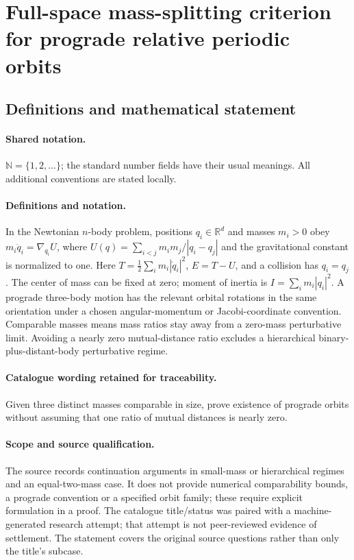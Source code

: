 \documentclass[11pt]{article}
\begin{document}
\section{Full-space mass-splitting criterion for prograde relative periodic orbits}\label{statement}

\subsection{Definitions and mathematical statement}

\paragraph{Shared notation.}$\mathbb N=\{1,2,\ldots\}$; the standard number fields have their usual meanings. All additional conventions are stated locally.


\paragraph{Definitions and notation.}In the Newtonian $n$-body problem, positions $q_i\in\mathbb R^d$ and masses $m_i>0$ obey $m_i\ddot q_i=\nabla_{q_i}U$, where $U(q)=\sum_{i<j}m_im_j/|q_i-q_j|$ and the gravitational constant is normalized to one. Here $T=\tfrac12\sum_i m_i|\dot q_i|^2$, $E=T-U$, and a collision has $q_i=q_j$. The center of mass can be fixed at zero; moment of inertia is $I=\sum_i m_i|q_i|^2$. A prograde three-body motion has the relevant orbital rotations in the same orientation under a chosen angular-momentum or Jacobi-coordinate convention. Comparable masses means mass ratios stay away from a zero-mass perturbative limit. Avoiding a nearly zero mutual-distance ratio excludes a hierarchical binary-plus-distant-body perturbative regime.

\paragraph{Catalogue wording retained for traceability.}
Given three distinct masses comparable in size, prove existence of prograde orbits without assuming that one ratio of mutual distances is nearly zero.
\paragraph{Scope and source qualification.}The source records continuation arguments in small-mass or hierarchical regimes and an equal-two-mass case. It does not provide numerical comparability bounds, a prograde convention or a specified orbit family; these require explicit formulation in a proof. The catalogue title/status was paired with a machine-generated research attempt; that attempt is not peer-reviewed evidence of settlement. The statement covers the original source questions rather than only the title’s subcase.
\end{document}
